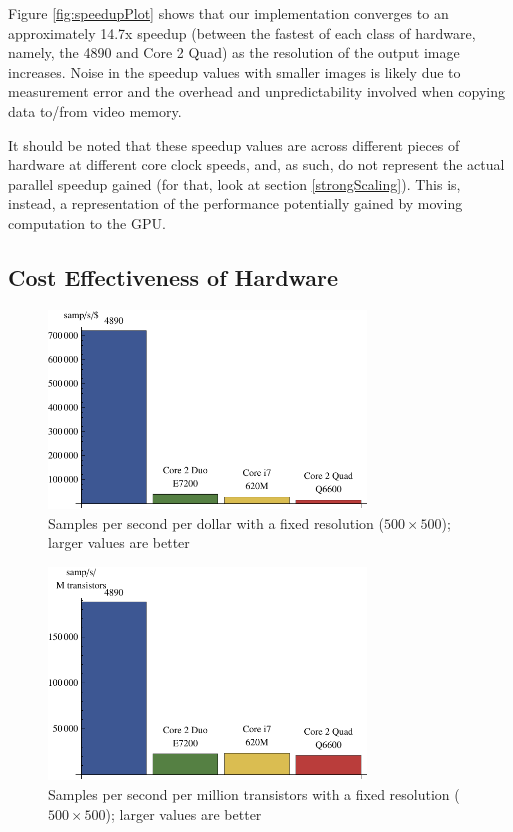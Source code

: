 \documentclass{acmsiggraph}
\begin{document}
Figure \ref{fig:speedupPlot} shows that our implementation converges to an approximately 14.7x speedup (between the fastest of each class of hardware, namely, the 4890 and Core 2 Quad) as the resolution of the output image increases. Noise in the speedup values with smaller images is likely due to measurement error and the overhead and unpredictability involved when copying data to/from video memory.

It should be noted that these speedup values are across different pieces of hardware at different core clock speeds, and, as such, do not represent the actual parallel speedup gained (for that, look at section \ref{strongScaling}). This is, instead, a representation of the performance potentially gained by moving computation to the GPU.

\subsection{Cost Effectiveness of Hardware}

\begin{figure}
    \includegraphics[width=84.5mm]{dollarPlot.pdf}
    \caption{Samples per second per dollar with a fixed resolution ($500\times500$); larger values are better}
    \label{fig:costEffectiveness}
\end{figure}

\begin{figure}
    \includegraphics[width=84.5mm]{transistorPlot.pdf}
    \caption{Samples per second per million transistors with a fixed resolution ($500\times500$); larger values are better}
    \label{fig:transistorPlot}
\end{figure}
\end{document}
